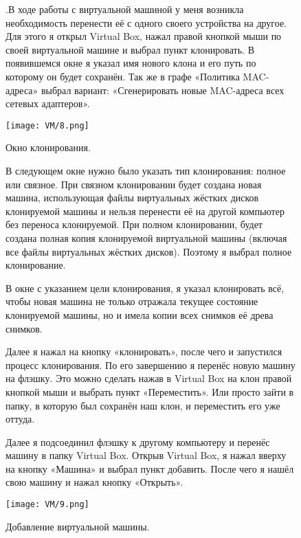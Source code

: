 \begin{figure}
.\quad В ходе работы с виртуальной машиной у меня возникла необходимость перенести её с одного своего устройства на другое.
\newline Для этого я открыл Virtual Box, нажал правой кнопкой мыши по своей виртуальной машине и выбрал пункт клонировать. В появившемся окне я указал имя нового клона и его путь по которому он будет сохранён. Так же в графе «Политика MAC-адреса» выбрал вариант: «Сгенерировать новые MAC-адреса всех сетевых адаптеров».

		\centering
		\texttt{[image: VM/8.png]}
\caption{Окно клонирования.}
\label{ris:image}
\end{figure}

\begin{figure}
\quad В следующем окне нужно было указать тип клонирования: полное или связное. При связном клонировании будет создана новая машина, использующая файлы виртуальных жёстких дисков клонируемой машины и нельзя перенести её на другой компьютер без переноса клонируемой. При полном клонировании, будет создана полная копия клонируемой виртуальной машины (включая все файлы виртуальных жёстких дисков). Поэтому я выбрал полное клонирование.
\end{figure}

\begin{figure}
\quad В окне с указанием цели клонирования, я указал клонировать всё, чтобы новая машина не только отражала текущее состояние клонируемой машины, но и имела копии всех снимков её древа снимков.
\end{figure}

\begin{figure}
\quad Далее я нажал на кнопку «клонировать», после чего и запустился процесс клонирования. По его завершению я перенёс новую машину на флэшку. Это можно сделать нажав в Virtual Box на клон правой кнопкой мыши и выбрать пункт «Переместить». Или просто зайти в папку, в которую был сохранён наш клон, и переместить его уже оттуда.
\end{figure}

\begin{figure}
\quad Далее я подсоединил флэшку к другому компьютеру и перенёс машину в папку Virtual Box. Открыв Virtual Box, я нажал вверху на кнопку «Машина» и выбрал пункт добавить. После чего я нашёл свою машину и нажал кнопку «Открыть».

		\centering
		\texttt{[image: VM/9.png]}
\caption{Добавление виртуальной машины.}
\label{ris:image}
\end{figure}

